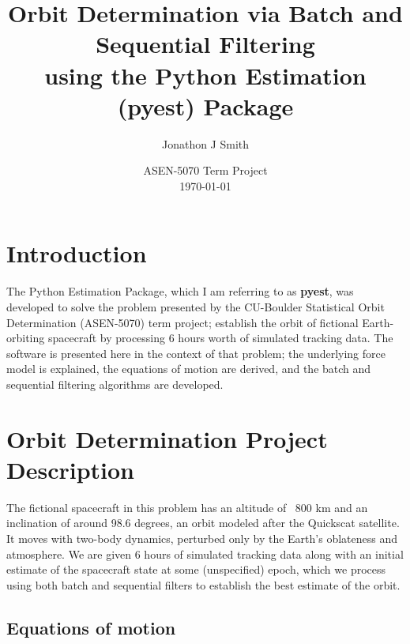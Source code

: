 \documentclass[10pt]{article}
\title{Orbit Determination via Batch and Sequential Filtering\\ using the Python Estimation (pyest) Package\\}
\author{Jonathon J Smith}
\date{ASEN-5070 Term Project \\\today}
\begin{document}
\maketitle
\tableofcontents
\newpage

\section{Introduction}

The Python Estimation Package, which I am referring to as \textbf{pyest}, was developed to solve the problem presented by the CU-Boulder Statistical Orbit Determination (ASEN-5070) term project; establish the orbit of fictional Earth-orbiting spacecraft by processing 6 hours worth of simulated tracking data. The software is presented here in the context of that problem; the underlying force model is explained, the equations of motion are derived, and the batch and sequential filtering algorithms are developed. 


\section{Orbit Determination Project Description}

The fictional spacecraft in this problem has an altitude of ~800 km and an inclination of around 98.6 degrees, an orbit modeled after the Quickscat satellite. It moves with two-body dynamics, perturbed only by the Earth's oblateness and atmosphere. We are given 6 hours of simulated tracking data along with an initial estimate of the spacecraft state at some (unspecified) epoch, which we process using both batch and sequential filters to establish the best estimate of the orbit.
 
\subsection{Equations of motion}
\end{document}
